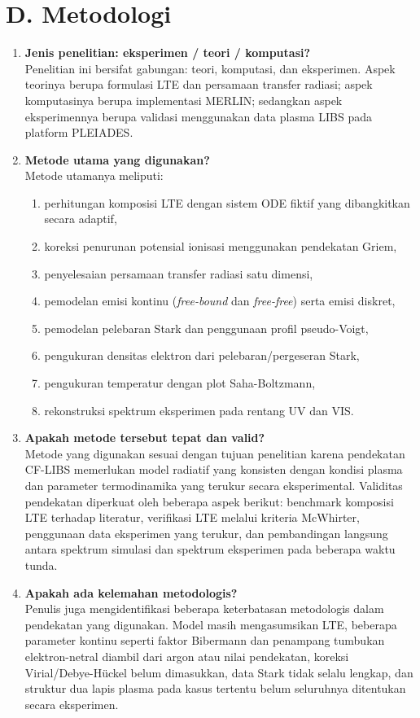 \documentclass[12pt,a4paper]{article}
\begin{document}
\section*{D. Metodologi}
\begin{enumerate}
  \item \textbf{Jenis penelitian: eksperimen / teori / komputasi?}\\
  Penelitian ini bersifat gabungan: teori, komputasi, dan eksperimen. Aspek teorinya berupa formulasi LTE dan persamaan transfer radiasi; aspek komputasinya berupa implementasi MERLIN; sedangkan aspek eksperimennya berupa validasi menggunakan data plasma LIBS pada platform PLEIADES.

  \item \textbf{Metode utama yang digunakan?}\\
  Metode utamanya meliputi:
  \begin{enumerate}
    \item perhitungan komposisi LTE dengan sistem ODE fiktif yang dibangkitkan secara adaptif,
    \item koreksi penurunan potensial ionisasi menggunakan pendekatan Griem,
    \item penyelesaian persamaan transfer radiasi satu dimensi,
    \item pemodelan emisi kontinu (\textit{free-bound} dan \textit{free-free}) serta emisi diskret,
    \item pemodelan pelebaran Stark dan penggunaan profil pseudo-Voigt,
    \item pengukuran densitas elektron dari pelebaran/pergeseran Stark,
    \item pengukuran temperatur dengan plot Saha-Boltzmann,
    \item rekonstruksi spektrum eksperimen pada rentang UV dan VIS.
  \end{enumerate}

  \item \textbf{Apakah metode tersebut tepat dan valid?}\\
  Metode yang digunakan sesuai dengan tujuan penelitian karena pendekatan CF-LIBS memerlukan model radiatif yang konsisten dengan kondisi plasma dan parameter termodinamika yang terukur secara eksperimental. Validitas pendekatan diperkuat oleh beberapa aspek berikut: benchmark komposisi LTE terhadap literatur, verifikasi LTE melalui kriteria McWhirter, penggunaan data eksperimen yang terukur, dan pembandingan langsung antara spektrum simulasi dan spektrum eksperimen pada beberapa waktu tunda.

  \item \textbf{Apakah ada kelemahan metodologis?}\\
  Penulis juga mengidentifikasi beberapa keterbatasan metodologis dalam pendekatan yang digunakan. Model masih mengasumsikan LTE, beberapa parameter kontinu seperti faktor Bibermann dan penampang tumbukan elektron-netral diambil dari argon atau nilai pendekatan, koreksi Virial/Debye-H\"uckel belum dimasukkan, data Stark tidak selalu lengkap, dan struktur dua lapis plasma pada kasus tertentu belum seluruhnya ditentukan secara eksperimen.
\end{enumerate}
\end{document}
